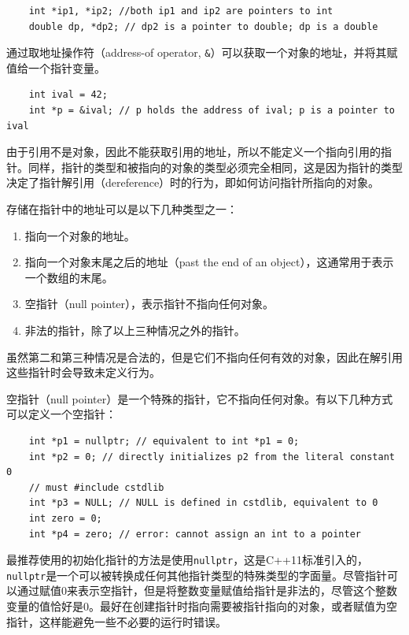 \begin{verbatim}
    int *ip1, *ip2; //both ip1 and ip2 are pointers to int
    double dp, *dp2; // dp2 is a pointer to double; dp is a double
\end{verbatim}

通过取地址操作符（address-of operator, \texttt{&}）可以获取一个对象的地址，并将其赋值给一个指针变量。

\begin{verbatim}
    int ival = 42;
    int *p = &ival; // p holds the address of ival; p is a pointer to ival
\end{verbatim}

由于引用不是对象，因此不能获取引用的地址，所以不能定义一个指向引用的指针。同样，指针的类型和被指向的对象的类型必须完全相同，这是因为指针的类型决定了指针解引用（dereference）时的行为，即如何访问指针所指向的对象。

存储在指针中的地址可以是以下几种类型之一：

\begin{enumerate}
    \item 指向一个对象的地址。
    \item 指向一个对象末尾之后的地址（past the end of an object），这通常用于表示一个数组的末尾。
    \item 空指针（null pointer），表示指针不指向任何对象。
    \item 非法的指针，除了以上三种情况之外的指针。
\end{enumerate}

虽然第二和第三种情况是合法的，但是它们不指向任何有效的对象，因此在解引用这些指针时会导致未定义行为。

空指针（null pointer）是一个特殊的指针，它不指向任何对象。有以下几种方式可以定义一个空指针：

\begin{verbatim}
    int *p1 = nullptr; // equivalent to int *p1 = 0;
    int *p2 = 0; // directly initializes p2 from the literal constant 0
    // must #include cstdlib
    int *p3 = NULL; // NULL is defined in cstdlib, equivalent to 0
    int zero = 0;
    int *p4 = zero; // error: cannot assign an int to a pointer
\end{verbatim}

最推荐使用的初始化指针的方法是使用\texttt{nullptr}，这是C++11标准引入的，\texttt{nullptr}是一个可以被转换成任何其他指针类型的特殊类型的字面量。尽管指针可以通过赋值0来表示空指针，但是将整数变量赋值给指针是非法的，尽管这个整数变量的值恰好是0。最好在创建指针时指向需要被指针指向的对象，或者赋值为空指针，这样能避免一些不必要的运行时错误。

